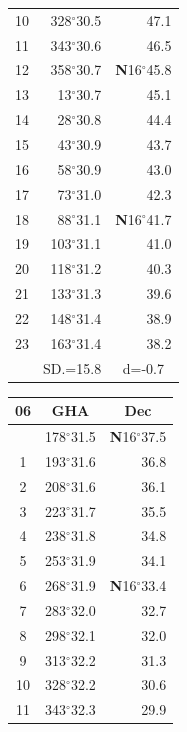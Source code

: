 \documentclass[10pt, a4paper]{report}
\begin{document}
\begin{scriptsize}
\begin{tabular*}{0.2\textwidth}[t]{@{\extracolsep{\fill}}|c|rr|}
10 & 328$^\circ$30.5 & 47.1\\
11 & 343$^\circ$30.6 & 46.5\\[2Pt]
12 & 358$^\circ$30.7 & \textbf{N}16$^\circ$45.8\\
13 & 13$^\circ$30.7 & 45.1\\
14 & 28$^\circ$30.8 & 44.4\\
15 & 43$^\circ$30.9 & \raisebox{0.24ex}{\boldmath$\cdot$~\boldmath$\cdot$~~}43.7\\
16 & 58$^\circ$30.9 & 43.0\\
17 & 73$^\circ$31.0 & 42.3\\[2Pt]
18 & 88$^\circ$31.1 & \textbf{N}16$^\circ$41.7\\
19 & 103$^\circ$31.1 & 41.0\\
20 & 118$^\circ$31.2 & 40.3\\
21 & 133$^\circ$31.3 & \raisebox{0.24ex}{\boldmath$\cdot$~\boldmath$\cdot$~~}39.6\\
22 & 148$^\circ$31.4 & 38.9\\
23 & 163$^\circ$31.4 & 38.2\\
\hline
\rule{0pt}{2.4ex} & \multicolumn{1}{c}{SD.=15.8} & \multicolumn{1}{c|}{d=-0.7}\\
\hline
\end{tabular*}\noindent
\begin{tabular*}{0.2\textwidth}[t]{@{\extracolsep{\fill}}|c|rr|}
\hline
\multicolumn{1}{|c|}{\rule{0pt}{2.6ex}\textbf{06}} & \multicolumn{1}{c}{\textbf{GHA}} & \multicolumn{1}{c|}{\textbf{Dec}}\\
\hline\rule{0pt}{2.6ex}\noindent
0 & 178$^\circ$31.5 & \textbf{N}16$^\circ$37.5\\
1 & 193$^\circ$31.6 & 36.8\\
2 & 208$^\circ$31.6 & 36.1\\
3 & 223$^\circ$31.7 & \raisebox{0.24ex}{\boldmath$\cdot$~\boldmath$\cdot$~~}35.5\\
4 & 238$^\circ$31.8 & 34.8\\
5 & 253$^\circ$31.9 & 34.1\\[2Pt]
6 & 268$^\circ$31.9 & \textbf{N}16$^\circ$33.4\\
7 & 283$^\circ$32.0 & 32.7\\
8 & 298$^\circ$32.1 & 32.0\\
9 & 313$^\circ$32.2 & \raisebox{0.24ex}{\boldmath$\cdot$~\boldmath$\cdot$~~}31.3\\
10 & 328$^\circ$32.2 & 30.6\\
11 & 343$^\circ$32.3 & 29.9\\[2Pt]

\end{tabular*}
\end{scriptsize}
\end{document}
